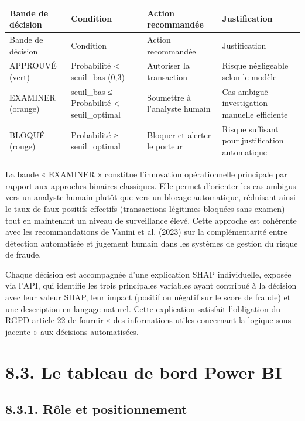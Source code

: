 \begin{longtable}{|p{}|p{}|p{}|p{}|}
\hline
Bande de décision & Condition & Action recommandée & Justification \\
\hline
\endfirsthead
\hline
Bande de décision & Condition & Action recommandée & Justification \\
\hline
\endhead
APPROUVÉ (vert) & Probabilité < seuil\_bas (0,3) & Autoriser la transaction & Risque négligeable selon le modèle \\
\hline
EXAMINER (orange) & seuil\_bas ≤ Probabilité < seuil\_optimal & Soumettre à l'analyste humain & Cas ambiguë — investigation manuelle efficiente \\
\hline
BLOQUÉ (rouge) & Probabilité ≥ seuil\_optimal & Bloquer et alerter le porteur & Risque suffisant pour justification automatique \\
\hline
\end{longtable}

La bande « EXAMINER » constitue l'innovation opérationnelle principale par rapport aux approches binaires classiques. Elle permet d'orienter les cas ambigus vers un analyste humain plutôt que vers un blocage automatique, réduisant ainsi le taux de faux positifs effectifs (transactions légitimes bloquées sans examen) tout en maintenant un niveau de surveillance élevé. Cette approche est cohérente avec les recommandations de Vanini et al. (2023) sur la complémentarité entre détection automatisée et jugement humain dans les systèmes de gestion du risque de fraude.

Chaque décision est accompagnée d'une explication SHAP individuelle, exposée via l'API, qui identifie les trois principales variables ayant contribué à la décision avec leur valeur SHAP, leur impact (positif ou négatif sur le score de fraude) et une description en langage naturel. Cette explication satisfait l'obligation du RGPD article 22 de fournir « des informations utiles concernant la logique sous-jacente » aux décisions automatisées.

\section{8.3. Le tableau de bord Power BI}

\subsection{8.3.1. Rôle et positionnement}

